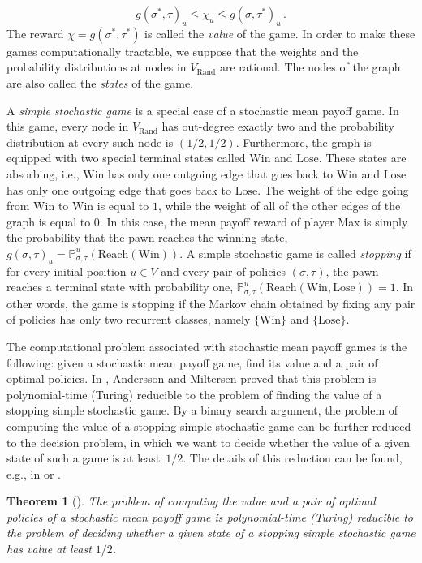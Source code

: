 \documentclass[11pt]{article}
\newtheorem{theorem}{Theorem}[section]
\theoremstyle{definition}
\theoremstyle{remark}
\newcommand{\vertices}{V}
\newcommand{\Rand}{\mathrm{Rand}}
\newcommand{\Randvertices}{\vertices_{\Rand}}
\newcommand{\Win}{\mathrm{Win}}
\newcommand{\Lose}{\mathrm{Lose}}
\begin{document}
\[
g(\sigma^*,\tau)_u \le \chi_u \le g(\sigma,\tau^*)_u \, .
\]
The reward $\chi = g(\sigma^*,\tau^*)$ is called the \emph{value} of the game. In order to make these games computationally tractable, we suppose that the weights and the probability distributions at nodes in $\Randvertices$ are rational. The nodes of the graph are also called the \emph{states} of the game.

A \emph{simple stochastic game} is a special case of a stochastic mean payoff game. In this game, every node in $\Randvertices$ has out-degree exactly two and the probability distribution at every such node is $(1/2,1/2)$. Furthermore, the graph is equipped with two special terminal states called $\Win$ and $\Lose$. These states are absorbing, i.e., $\Win$ has only one outgoing edge that goes back to $\Win$ and $\Lose$ has only one outgoing edge that goes back to $\Lose$. The weight of the edge going from $\Win$ to $\Win$ is equal to $1$, while the weight of all of the other edges of the graph is equal to $0$. In this case, the mean payoff reward of player Max is simply the probability that the pawn reaches the winning state, $g(\sigma,\tau)_u = \mathbb{P}^{u}_{\sigma,\tau}(\text{Reach}(\Win))$. A simple stochastic game is called \emph{stopping} if for every initial position $u \in V$ and every pair of policies $(\sigma,\tau)$, the pawn reaches a terminal state with probability one, $\mathbb{P}^{u}_{\sigma,\tau}(\text{Reach}(\Win,\Lose)) = 1$. In other words, the game is stopping if the Markov chain obtained by fixing any pair of policies has only two recurrent classes, namely $\{\Win\}$ and $\{\Lose\}$.


The computational problem associated with stochastic mean payoff games is the following: given a stochastic mean payoff game, find its value and a pair of optimal policies. In \cite{andersson_miltersen}, Andersson and Miltersen proved that this problem is polynomial-time (Turing) reducible to the problem of finding the value of a stopping simple stochastic game.
By a binary search argument, the problem of computing the value of a stopping simple stochastic game can be further reduced to the decision problem, in which we want to decide whether the value of a given state of such a game is at least~$1/2$. 
The details of this reduction can be found, e.g., in \cite{issac2016jsc} or \cite[Section~7.1]{skomra_phd}.

\begin{theorem}[{\cite[Lemma~48]{issac2016jsc}}] \label{thm:smpg-to-stopping}
The problem of computing the value and a pair of optimal policies of a stochastic mean payoff game is polynomial-time (Turing) reducible to the problem of deciding whether a given state of a stopping simple stochastic game has value at least $1/2$.
\end{theorem}
\end{document}
